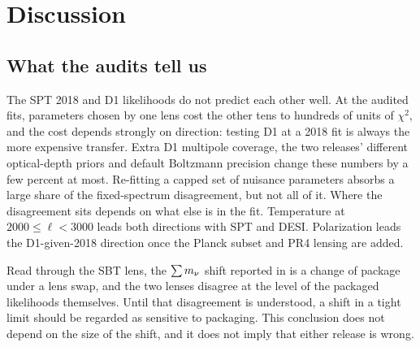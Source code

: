 \section{Discussion}
\label{sec:discussion}

\subsection{What the audits tell us}
The SPT 2018 and D1 likelihoods do not predict each other well. At the audited fits, parameters chosen by one lens cost the other tens to hundreds of units of $\chi^2$, and the cost depends strongly on direction: testing D1 at a 2018 fit is always the more expensive transfer. Extra D1 multipole coverage, the two releases' different optical-depth priors and default Boltzmann precision change these numbers by a few percent at most. Re-fitting a capped set of nuisance parameters absorbs a large share of the fixed-spectrum disagreement, but not all of it. Where the disagreement sits depends on what else is in the fit. Temperature at $2000\le\ell<3000$ leads both directions with SPT and DESI. Polarization leads the D1-given-2018 direction once the Planck subset and PR4 lensing are added.

Read through the SBT lens, the $\sum m_\nu$ shift reported in \cite{arxiv2601_16277} is a change of package under a lens swap, and the two lenses disagree at the level of the packaged likelihoods themselves. Until that disagreement is understood, a shift in a tight limit should be regarded as sensitive to packaging. This conclusion does not depend on the size of the shift, and it does not imply that either release is wrong.

